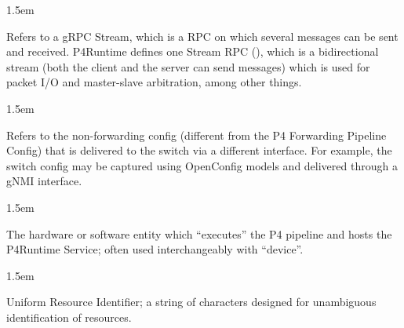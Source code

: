 \documentclass[11pt]{article}
\begin{document}
{\begin{mddefinitions}

\begin{mdbmarginx}{}{}{}{1.5em}%
\begin{mddefdata}%
Refers to a gRPC Stream, which is a RPC on which several messages can be
sent and received. P4Runtime defines one Stream RPC (), which
is a bidirectional stream (both the client and the server can send messages)
which is used for packet I/O and master-slave arbitration, among other
things.
\end{mddefdata}%
\end{mdbmarginx}%


\begin{mdbmarginx}{}{}{}{1.5em}%
\begin{mddefdata}%
Refers to the non-forwarding config (different from the P4 Forwarding
Pipeline Config) that is delivered to the switch via a different
interface. For example, the switch config may be captured using OpenConfig
models and delivered through a gNMI interface.
\end{mddefdata}%
\end{mdbmarginx}%


\begin{mdbmarginx}{}{}{}{1.5em}%
\begin{mddefdata}%
The hardware or software entity which \textquotedblleft{}executes\textquotedblright{} the P4 pipeline and hosts
the P4Runtime Service; often used interchangeably with \textquotedblleft{}device\textquotedblright{}.
\end{mddefdata}%
\end{mdbmarginx}%


\begin{mdbmarginx}{}{}{}{1.5em}%
\begin{mddefdata}%
Uniform Resource Identifier; a string of characters designed for unambiguous
identification of resources.%
\end{mddefdata}%
\end{mdbmarginx}%
\end{mddefinitions}%

}
\end{document}
